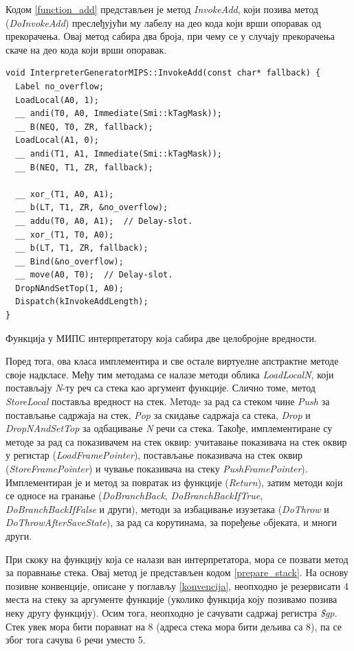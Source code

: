 \documentclass[12pt,oneside]{memoir}
\begin{document}
Кодом \ref{function_add} представљен је метод \textit{InvokeAdd}, који позива метод (\textit{DoInvokeAdd}) преслеђујући му лабелу на део кода који врши опоравак од прекорачења. Овај метод сабира два броја, при чему се у случају прекорачења скаче на део кода који врши опоравак.

\begin{listing}
\begin{verbatim}
void InterpreterGeneratorMIPS::InvokeAdd(const char* fallback) {
  Label no_overflow;
  LoadLocal(A0, 1);
  __ andi(T0, A0, Immediate(Smi::kTagMask));
  __ B(NEQ, T0, ZR, fallback);
  LoadLocal(A1, 0);
  __ andi(T1, A1, Immediate(Smi::kTagMask));
  __ B(NEQ, T1, ZR, fallback);

  __ xor_(T1, A0, A1);
  __ b(LT, T1, ZR, &no_overflow);
  __ addu(T0, A0, A1);  // Delay-slot.
  __ xor_(T1, T0, A0);
  __ b(LT, T1, ZR, fallback);
  __ Bind(&no_overflow);
  __ move(A0, T0);  // Delay-slot.
  DropNAndSetTop(1, A0);
  Dispatch(kInvokeAddLength);
}
\end{verbatim}
\caption{Функција у МИПС интерпретатору која сабира две целобројне вредности.}
\label{function_add}
\end{listing}

Поред тога, ова класа имплементира и све остале виртуелне апстрактне методе своје надкласе. Међу тим методама се налазе методи облика \textit{LoadLocalN}, који постављају \textit{N}-ту реч са стека као аргумент функције. Слично томе, метод \textit{StoreLocal} поставља вредност на стек. Mетодe за рад са стеком чине \textit{Push} за постављање садржаја на стек, \textit{Pop} за скидање садржаја са стека, \textit{Drop} и \textit{DropNAndSetTop} за одбацивање \textit{N} речи са стека. Такође, имплементиране су методе за рад са показивачем на стек оквир: учитавање показивача на стек оквир у регистар (\textit{LoadFramePointer}), постављање показивача на стек оквир (\textit{StoreFramePointer}) и чување показивача на стеку \textit{PushFramePointer}). Имплементиран је и метод за повратак из функције (\textit{Return}), затим методи који се односе на гранање (\textit{DoBranchBack}, \textit{DoBranchBackIfTrue}, \textit{DoBranchBackIfFalse} и други), методи за избацивање изузетака (\textit{DoThrow} и \textit{DoThrowAfterSaveState}), за рад са корутинама, за поређење oбјеката, и многи други.

При скоку на функцију која се налази ван интерпретатора, мора се позвати метод за поравнање стека. Овај метод је представљен кодом \ref{prepare_stack}. На основу позивне конвенције, описане у поглављу \ref{konvencija}, неопходно је резервисати 4 места на стеку за аргументе функције (уколико функција коју позивамо позива неку другу функцију). Осим тога, неопходно је сачувати садржај регистра \textit{\$gp}. Стек увек мора бити поравнат на 8 (адреса стека мора бити дељива са 8), па се због тога сачува 6 речи уместо 5.
\end{document}

